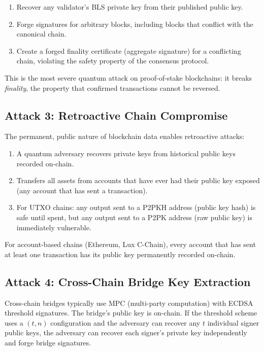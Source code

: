 \begin{enumerate}[leftmargin=2em]
  \item Recover any validator's BLS private key from their published public key.
  \item Forge signatures for arbitrary blocks, including blocks that conflict with
        the canonical chain.
  \item Create a forged finality certificate (aggregate signature) for a conflicting
        chain, violating the safety property of the consensus protocol.
\end{enumerate}

This is the most severe quantum attack on proof-of-stake blockchains: it breaks
\emph{finality}, the property that confirmed transactions cannot be reversed.

\subsection{Attack 3: Retroactive Chain Compromise}

The permanent, public nature of blockchain data enables retroactive attacks:

\begin{enumerate}[leftmargin=2em]
  \item A quantum adversary recovers private keys from historical public keys
        recorded on-chain.
  \item Transfers all assets from accounts that have ever had their public key
        exposed (any account that has sent a transaction).
  \item For UTXO chains: any output sent to a P2PKH address (public key hash) is
        safe until spent, but any output sent to a P2PK address (raw public key) is
        immediately vulnerable.
\end{enumerate}

For account-based chains (Ethereum, Lux C-Chain), every account that has sent at
least one transaction has its public key permanently recorded on-chain.

\subsection{Attack 4: Cross-Chain Bridge Key Extraction}

Cross-chain bridges typically use MPC (multi-party computation) with ECDSA threshold
signatures. The bridge's public key is on-chain. If the threshold scheme uses a
$(t, n)$ configuration and the adversary can recover any $t$ individual signer public
keys, the adversary can recover each signer's private key independently and forge
bridge signatures.

